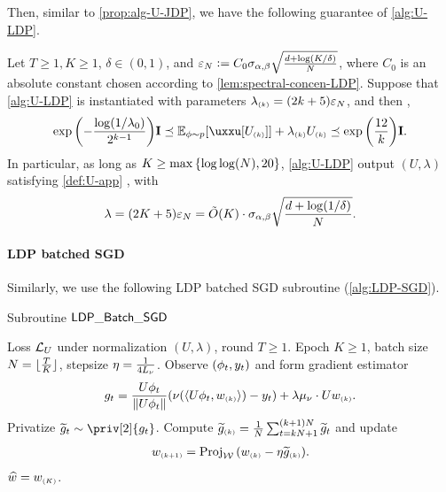 Then, similar to \cref{prop:alg-U-JDP}, we have the following guarantee of \cref{alg:U-LDP}. 

\begin{proposition}\label{prop:alg-U-LDP}
Let $T\geq 1, K\geq 1$, $\delta\in(0,1)$, and $\varepsilon_N\mathrel{\mathop:}= C_0\sigma_{\alpha,\beta}\sqrt{\frac{d+\log(K/\delta)}{N}}$, where $C_0$ is an absolute constant chosen according to \cref{lem:spectral-concen-LDP}. Suppose that \cref{alg:U-LDP} is instantiated with parameters $\lambda_{\scriptscriptstyle{ (k) }}=(2k+5)\varepsilon_N$, and then \whp,
\begin{align*}
    \exp\paren{ -\frac{\log(1/\lambda_0)}{2^{k-1}} }\id \preceq \Ep{ \uxxu[U\kk] }+\lambda\kk U\kk \preceq \exp\paren{ \frac{12}{k} }\id.
\end{align*}
In particular, as long as $K\geq \max\left\{\log\log(N),20\right\}$, \cref{alg:U-LDP} output $(U,\lambda)$ satisfying \eqref{def:U-app} \whp, with
\begin{align*}
    \lambda=(2K+5)\varepsilon_N=\tilde{O}{\left( K \right)}\cdot \sigma_{\alpha,\beta} \sqrt{\frac{d+\log(1/\delta)}{N}}.
\end{align*}
\end{proposition}

\paragraph{LDP batched SGD} Similarly, we use the following LDP batched SGD subroutine (\cref{alg:LDP-SGD}).


\begin{algorithm}[H]
\caption{Subroutine $\mathsf{LDP\_Batch\_SGD}$}\label{alg:LDP-SGD}
\begin{algorithmic}
\REQUIRE Loss $\mathcal{L}_{U}$ under normalization $(U,\lambda)$, round $T\geq 1$.
\REQUIRE Epoch $K\geq 1$, batch size $N=\lfloor\frac{T}{K}\rfloor$, stepsize $\eta=\frac{1}{4L_\nu}$.
\STATE Observe $(\phi_t,y_t)$ and form gradient estimator
\begin{align*}
    g_t=\frac{U\phi_t}{\|U\phi_t\|}{\left(  \nu(\langle U\phi_t, w_{\scriptscriptstyle{ (k) }} \rangle) -y_t  \right)}+\lambda\mu_\nu \cdot  U w_{\scriptscriptstyle{ (k) }}.
\end{align*}
\STATE Privatize $\til g_t\sim \priv[2]{g_t}$.
\ENDFOR
\STATE Compute $\widetilde g_{\scriptscriptstyle{ (k) }}=\frac1N \sum_{t=kN+1}^{(k+1)N} \widetilde g_t$ and update
\begin{align*}
    w_{\scriptscriptstyle{ (k+1) }}=\operatorname{Proj}_{\mathcal{W}}{\left(  w_{\scriptscriptstyle{ (k) }}-\eta \widetilde g_{\scriptscriptstyle{ (k) }} \right)} .
\end{align*}
\ENDFOR
\ENSURE $\widehat{w}=w_{\scriptscriptstyle{ (K) }}$.
\end{algorithmic}
\end{algorithm}

